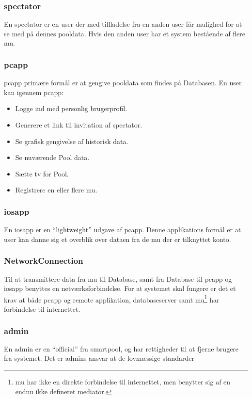 
\subsubsection{\Gls{spectator}}
En \gls{spectator} er en \gls{user} der med tillladelse fra en anden \gls{user} får mulighed for at se med på dennes pooldata. Hvis den anden \gls{user} har et system bestående af flere \gls{mu}.

\subsubsection{\gls{pcapp}}
\gls{pcapp} primære formål er at gengive pooldata som findes på Databasen. En \gls{user} kan igennem \gls{pcapp}:

\begin{itemize}
	\item Logge ind med personlig brugerprofil.
	\item Generere et link til invitation af \gls{spectator}.
	\item Se grafisk gengivelse af historisk data.
	\item Se nuværende Pool data.
	\item Sætte \gls{tv} for Pool.
	\item Registrere en eller flere \gls{mu}.
\end{itemize}

\subsubsection{\gls{iosapp}}
En \gls{iosapp} er en “lightweight” udgave af \gls{pcapp}. Denne applikations formål er at \gls{user} kan danne sig et overblik over dataen fra de \gls{mu} der er tilknyttet konto.

\subsubsection{NetworkConnection}
Til at transmittere data fra \gls{mu} til Database, samt fra Database til \gls{pcapp} og \gls{iosapp} benyttes en netværksforbindelse.  For at systemet skal fungere er det et krav at både \gls{pcapp} og remote applikation, databaseserver samt \gls{mu}\footnote{  \gls{mu} har ikke en direkte forbindelse til internettet, men benytter sig af en endnu ikke defineret mediator.} har forbindelse til internettet.

\subsubsection{\gls{admin}}
En \gls{admin} er en “official” fra \gls{smartpool}, og har rettigheder til at fjerne brugere fra systemet. Det er \glspl{admin} ansvar at de lovmæssige standarder%

